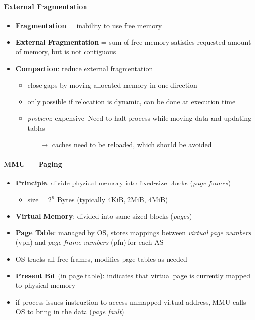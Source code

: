 \paragraph{External Fragmentation}
\begin{itemize}
  \item \textbf{Fragmentation} = inability to use free memory
  \item \textbf{External Fragmentation} = sum of free memory satisfies requested amount of memory, but is not contiguous
  \item \textbf{Compaction}: reduce external fragmentation
  \begin{itemize}
    \item close gaps by moving allocated memory in one direction
    \item only possible if relocation is dynamic, can be done at execution time
    \item \emph{problem}: expensive! Need to halt process while moving data and updating tables
    \begin{itemize}
      \item[$ \to $] caches need to be reloaded, which should be avoided 
    \end{itemize}
  \end{itemize}
\end{itemize}

\paragraph{MMU --- Paging}
\begin{itemize}
  \item \textbf{Principle}: divide physical memory into fixed-size blocks (\emph{page frames})
  \begin{itemize}
    \item size = \( 2^n \) Bytes (typically 4KiB, 2MiB, 4MiB)
  \end{itemize}
  \item \textbf{Virtual Memory}: divided into same-sized blocks (\emph{pages})
  \item \textbf{Page Table}: managed by OS, stores mappings between \emph{virtual page numbers} (vpn) and \emph{page frame numbers} (pfn) for each AS
  \item OS tracks all free frames, modifies page tables as needed
  \item \textbf{Present Bit} (in page table): indicates that virtual page is currently mapped to physical memory
  \item if process issues instruction to access unmapped virtual address, MMU calls OS to bring in the data (\emph{page fault})
\end{itemize}

